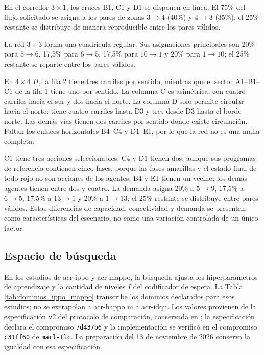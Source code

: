 En el corredor $3\times1$, los cruces B1, C1 y D1 se disponen en línea. El 75\% del flujo solicitado se asigna a los pares de zonas $3\to4$ (40\%) y $4\to3$ (35\%); el 25\% restante se distribuye de manera reproducible entre los pares válidos.

La red $3\times3$ forma una cuadrícula regular. Sus asignaciones principales son 20\% para $5\to6$, 17,5\% para $6\to5$, 17,5\% para $10\to1$ y 20\% para $1\to10$; el 25\% restante se reparte entre los pares válidos.

En $4\times4\_H$, la fila 2 tiene tres carriles por sentido, mientras que el sector A1--B1--C1 de la fila 1 tiene uno por sentido. La columna C es asimétrica, con cuatro carriles hacia el sur y dos hacia el norte. La columna D solo permite circular hacia el norte: tiene cuatro carriles hasta D3 y tres desde D3 hasta el borde norte. Las demás vías tienen dos carriles por sentido donde existe circulación. Faltan los enlaces horizontales B4--C4 y D1--E1, por lo que la red no es una malla completa.

C1 tiene tres acciones seleccionables. C4 y D1 tienen dos, aunque sus programas de referencia contienen cinco fases, porque las fases amarillas y el estado final de todo rojo no son acciones de los agentes. B4 y E1 tienen un vecino; los demás agentes tienen entre dos y cuatro. La demanda asigna 20\% a $5\to9$, 17,5\% a $6\to5$, 17,5\% a $13\to1$ y 20\% a $1\to13$; el 25\% restante se distribuye entre pares válidos. Estas diferencias de capacidad, conectividad y demanda se presentan como características del escenario, no como una variación controlada de un único factor.

\subsection{Espacio de búsqueda}
\label{subsec:espacio_busqueda}

En los estudios de \acrshort{acr-ippo} y \acrshort{acr-mappo}, la búsqueda ajusta los hiperparámetros de aprendizaje y la cantidad de niveles $I$ del codificador de espera. La Tabla \ref{tab:dominios_ippo_mappo} transcribe los dominios declarados para esos estudios; no se extrapolan a \acrshort{acr-happo} ni a \acrshort{acr-idqn}. Los valores provienen de la especificación v2 del protocolo de comparación, conservada en ; la especificación declara el compromiso \texttt{7d437b6} y la implementación se verificó en el compromiso \texttt{c31ff60} de \texttt{marl-tlc}. La preparación del 13 de noviembre de 2026 conserva la igualdad con esa especificación.


